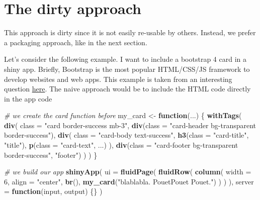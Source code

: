 \documentclass[]{book}
\newenvironment{Shaded}{\begin{snugshade}}{\end{snugshade}}
\newcommand{\CommentTok}[1]{\textcolor[rgb]{0.56,0.35,0.01}{\textit{#1}}}
\newcommand{\ControlFlowTok}[1]{\textcolor[rgb]{0.13,0.29,0.53}{\textbf{#1}}}
\newcommand{\DataTypeTok}[1]{\textcolor[rgb]{0.13,0.29,0.53}{#1}}
\newcommand{\DecValTok}[1]{\textcolor[rgb]{0.00,0.00,0.81}{#1}}
\newcommand{\KeywordTok}[1]{\textcolor[rgb]{0.13,0.29,0.53}{\textbf{#1}}}
\newcommand{\NormalTok}[1]{#1}
\newcommand{\StringTok}[1]{\textcolor[rgb]{0.31,0.60,0.02}{#1}}
\begin{document}
\hypertarget{the-dirty-approach}{%
\section{The dirty approach}\label{the-dirty-approach}}

This approach is dirty since it is not easily re-usable by others. Instead, we prefer a packaging approach, like in the next section.

Let's consider the following example. I want to include a bootstrap 4 card in a shiny app. Briefly, Bootstrap is the most popular HTML/CSS/JS framework to develop websites and web apps. This example is taken from an interesting question \href{https://community.rstudio.com/t/create-a-div-using-htmltools-withtags/22439/2}{here}.
The naive approach would be to include the HTML code directly in the app code

\begin{Shaded}
\begin{Highlighting}[]
\CommentTok{# we create the card function before}
\NormalTok{my_card <-}\StringTok{ }\ControlFlowTok{function}\NormalTok{(...) \{}
  \KeywordTok{withTags}\NormalTok{(}
    \KeywordTok{div}\NormalTok{(}
      \DataTypeTok{class =} \StringTok{"card border-success mb-3"}\NormalTok{,}
      \KeywordTok{div}\NormalTok{(}\DataTypeTok{class =} \StringTok{"card-header bg-transparent border-success"}\NormalTok{),}
      \KeywordTok{div}\NormalTok{(}
        \DataTypeTok{class =} \StringTok{"card-body text-success"}\NormalTok{,}
        \KeywordTok{h3}\NormalTok{(}\DataTypeTok{class =} \StringTok{"card-title"}\NormalTok{, }\StringTok{"title"}\NormalTok{),}
        \KeywordTok{p}\NormalTok{(}\DataTypeTok{class =} \StringTok{"card-text"}\NormalTok{, ...)}
\NormalTok{      ),}
      \KeywordTok{div}\NormalTok{(}\DataTypeTok{class =} \StringTok{"card-footer bg-transparent border-success"}\NormalTok{, }\StringTok{"footer"}\NormalTok{)}
\NormalTok{    )}
\NormalTok{  )}
\NormalTok{\}}

\CommentTok{# we build our app}
\KeywordTok{shinyApp}\NormalTok{(}
  \DataTypeTok{ui =} \KeywordTok{fluidPage}\NormalTok{(}
    \KeywordTok{fluidRow}\NormalTok{(}
      \KeywordTok{column}\NormalTok{(}
        \DataTypeTok{width =} \DecValTok{6}\NormalTok{,}
        \DataTypeTok{align =} \StringTok{"center"}\NormalTok{,}
        \KeywordTok{br}\NormalTok{(),}
        \KeywordTok{my_card}\NormalTok{(}\StringTok{"blablabla. PouetPouet Pouet."}\NormalTok{)}
\NormalTok{      )}
\NormalTok{    )}
\NormalTok{  ),}
  \DataTypeTok{server =} \ControlFlowTok{function}\NormalTok{(input, output) \{\}}
\NormalTok{)}
\end{Highlighting}
\end{Shaded}
\end{document}
